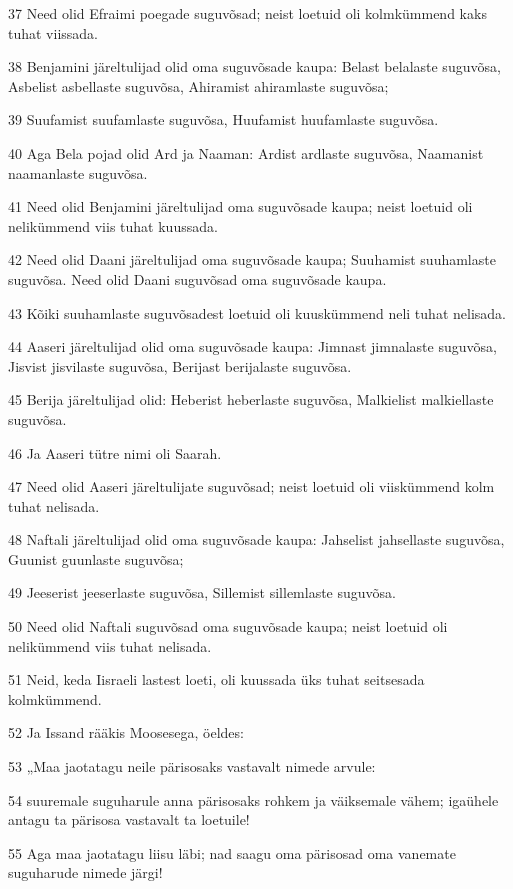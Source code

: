 \par 37 Need olid Efraimi poegade suguvõsad; neist loetuid oli kolmkümmend kaks tuhat viissada.
\par 38 Benjamini järeltulijad olid oma suguvõsade kaupa: Belast belalaste suguvõsa, Asbelist asbellaste suguvõsa, Ahiramist ahiramlaste suguvõsa;
\par 39 Suufamist suufamlaste suguvõsa, Huufamist huufamlaste suguvõsa.
\par 40 Aga Bela pojad olid Ard ja Naaman: Ardist ardlaste suguvõsa, Naamanist naamanlaste suguvõsa.
\par 41 Need olid Benjamini järeltulijad oma suguvõsade kaupa; neist loetuid oli nelikümmend viis tuhat kuussada.
\par 42 Need olid Daani järeltulijad oma suguvõsade kaupa; Suuhamist suuhamlaste suguvõsa. Need olid Daani suguvõsad oma suguvõsade kaupa.
\par 43 Kõiki suuhamlaste suguvõsadest loetuid oli kuuskümmend neli tuhat nelisada.
\par 44 Aaseri järeltulijad olid oma suguvõsade kaupa: Jimnast jimnalaste suguvõsa, Jisvist jisvilaste suguvõsa, Berijast berijalaste suguvõsa.
\par 45 Berija järeltulijad olid: Heberist heberlaste suguvõsa, Malkielist malkiellaste suguvõsa.
\par 46 Ja Aaseri tütre nimi oli Saarah.
\par 47 Need olid Aaseri järeltulijate suguvõsad; neist loetuid oli viiskümmend kolm tuhat nelisada.
\par 48 Naftali järeltulijad olid oma suguvõsade kaupa: Jahselist jahsellaste suguvõsa, Guunist guunlaste suguvõsa;
\par 49 Jeeserist jeeserlaste suguvõsa, Sillemist sillemlaste suguvõsa.
\par 50 Need olid Naftali suguvõsad oma suguvõsade kaupa; neist loetuid oli nelikümmend viis tuhat nelisada.
\par 51 Neid, keda Iisraeli lastest loeti, oli kuussada üks tuhat seitsesada kolmkümmend.
\par 52 Ja Issand rääkis Moosesega, öeldes:
\par 53 „Maa jaotatagu neile pärisosaks vastavalt nimede arvule:
\par 54 suuremale suguharule anna pärisosaks rohkem ja väiksemale vähem; igaühele antagu ta pärisosa vastavalt ta loetuile!
\par 55 Aga maa jaotatagu liisu läbi; nad saagu oma pärisosad oma vanemate suguharude nimede järgi!
